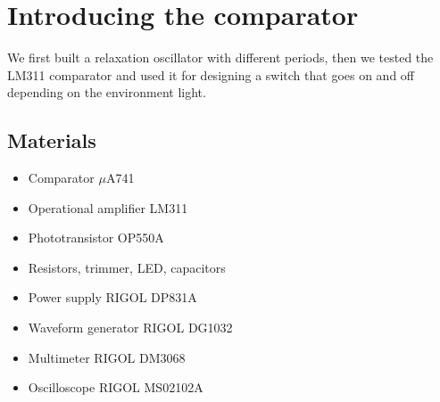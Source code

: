 
\chapter{Introducing the comparator}
We first built a relaxation oscillator with different periods, then we tested the LM311 comparator and used it for designing a switch that goes on and off depending on the environment light.

\section{Materials}
\begin{itemize}
\item Comparator $\mu$A741
\item Operational amplifier LM311
\item Phototransistor OP550A
\item Resistors, trimmer, LED, capacitors
\item Power supply RIGOL DP831A
\item Waveform generator RIGOL DG1032
\item Multimeter RIGOL DM3068
\item Oscilloscope RIGOL MS02102A
\end{itemize}

